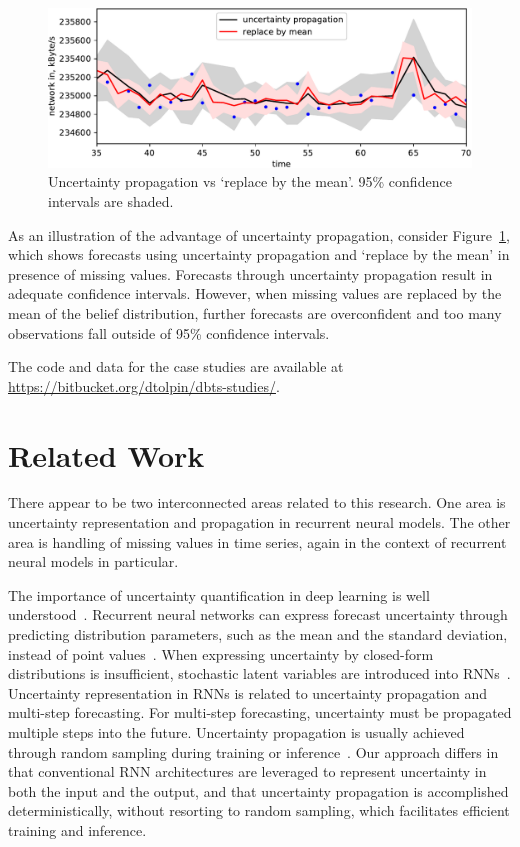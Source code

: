 \documentclass[runningheads]{llncs}
\begin{document}
\begin{figure}
\centering
\includegraphics[width=0.95\linewidth]{dist-vs-mean.pdf}
\caption{Uncertainty propagation vs `replace by the mean'. 95\% confidence intervals are shaded.}
\label{fig:dist-vs-mean}
\end{figure}
As an illustration of the advantage of uncertainty propagation,
consider Figure~\ref{fig:dist-vs-mean}, which shows forecasts
using uncertainty propagation and `replace by the mean' in presence
of missing values. Forecasts through uncertainty propagation
result in adequate confidence intervals. However, when missing
values are replaced by the mean of the belief distribution,
further forecasts are overconfident and too many observations
fall outside of 95\% confidence intervals.

The code and data for the case studies are available at
\url{https://bitbucket.org/dtolpin/dbts-studies/}.

\section{Related Work} 

There appear to be two interconnected areas related to this
research. One area is uncertainty representation and propagation
in recurrent neural models. The other area is handling of
missing values in time series, again in the context of
recurrent neural models in particular. 

The importance of uncertainty quantification in deep learning is
well understood~\cite{MFS+21}.  Recurrent neural networks can
express forecast uncertainty through predicting distribution
parameters, such as the mean and the standard deviation, instead
of point values~\cite{HS97}. When expressing uncertainty by closed-form
distributions is insufficient, stochastic latent
variables are introduced into RNNs~\cite{YB21,CKD+15,FSK+16}. 
Uncertainty representation in RNNs is related to uncertainty
propagation and multi-step forecasting. For multi-step
forecasting, uncertainty must be propagated multiple steps into
the future. Uncertainty propagation is usually achieved through
random sampling during training or inference~\cite{LYY+19,AV20,YB21}. 
Our approach differs in that conventional RNN architectures are
leveraged to represent uncertainty in both the input and
the output, and that uncertainty propagation is accomplished
deterministically, without resorting to random sampling, which
facilitates efficient training and inference.
\end{document}
